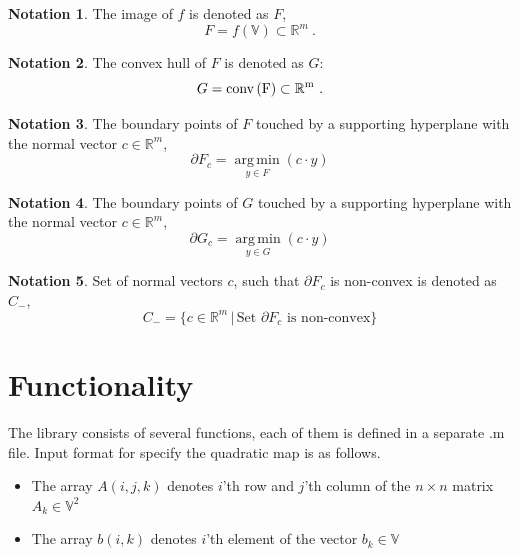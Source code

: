 \documentclass[a4paper]{article}
\DeclareMathOperator*{\argmin}{arg\,min}
\newcommand{\R}{\mathbb{R}}
\newcommand{\conv}{\rm{conv}\,}
\theoremstyle{definition}
\newtheorem{definition}{Notation}[]
\begin{document}
\begin{definition}
The image of $f$ is denoted as $F$,
	$$F=f(\mathbb{V})\subset \mathbb{R}^m\ .$$
\end{definition}
\begin{definition} The convex hull of $F$ is denoted as $G$:
	$$G=\conv (F)\subset \mathbb{R}^m\ .$$
\end{definition}
\begin{definition} The boundary points of $F$ touched by a supporting hyperplane with the normal vector $c\in\mathbb{R}^m$,
	$$\partial F_c=\argmin\limits_{y\in F}(c\cdot y)$$
\end{definition}
\begin{definition} The boundary points of $G$ touched by a supporting hyperplane with the normal vector $c\in\mathbb{R}^m$,
	$$\partial G_c=\argmin\limits_{y\in G}(c\cdot y)$$
\end{definition}
\begin{definition}\label{ex:c_minus}
	Set of normal vectors $c$, such that $\partial F_c$ is non-convex is denoted as $C_-$,
	$$C_-=\{c\in\R^m\,\big|\,\mbox{Set }\partial F_c\mbox{ is non-convex}\}$$
\end{definition}

\newpage

\section*{Functionality}
The library consists of several functions, each of them is defined in a separate .m file.
Input format for specify the quadratic map is as follows.

\begin{itemize}
\item The array $A(i, j, k)$ denotes $i$'th row and $j$'th column of the $n\times n$ matrix $A_k\in\mathbb{V}^2$
\item The array $b(i, k)$ denotes $i$'th element of the vector $b_k\in\mathbb{V}$
\end{itemize}
\end{document}
